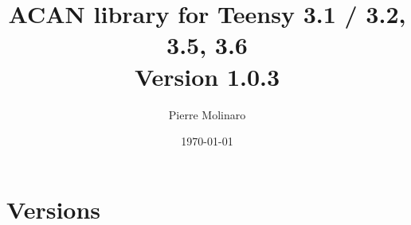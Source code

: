 \documentclass[10pt, a4paper, obeyspaces, openany]{extarticle}
\begin{document}
 


\title{\bf \Huge{ACAN library for Teensy 3.1 / 3.2, 3.5, 3.6\\Version 1.0.3}}
\author{Pierre Molinaro}
\date {\today}

\maketitle


\tableofcontents


\section{Versions}
\end{document}
